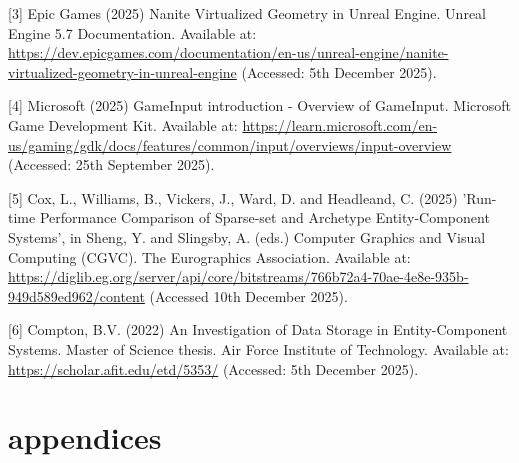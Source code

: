\documentclass[]{final_report}
\begin{document}
[3] Epic Games (2025) Nanite Virtualized Geometry in Unreal Engine. Unreal Engine 5.7 Documentation. Available at: \url{https://dev.epicgames.com/documentation/en-us/unreal-engine/nanite-virtualized-geometry-in-unreal-engine} (Accessed: 5th December 2025). \newline

[4] Microsoft (2025) GameInput introduction - Overview of GameInput. Microsoft Game Development Kit. Available at: \url{https://learn.microsoft.com/en-us/gaming/gdk/docs/features/common/input/overviews/input-overview} (Accessed: 25th September 2025). \newline

[5] Cox, L., Williams, B., Vickers, J., Ward, D. and Headleand, C. (2025) 'Run-time Performance Comparison of Sparse-set and Archetype Entity-Component Systems', in Sheng, Y. and Slingsby, A. (eds.) Computer Graphics and Visual Computing (CGVC). The Eurographics Association. Available at: \url{https://diglib.eg.org/server/api/core/bitstreams/766b72a4-70ae-4e8e-935b-949d589ed962/content} (Accessed 10th December 2025). \newline

[6] Compton, B.V. (2022) An Investigation of Data Storage in Entity-Component Systems. Master of Science thesis. Air Force Institute of Technology. Available at: \url{https://scholar.afit.edu/etd/5353/} (Accessed: 5th December 2025). \newline
\newpage
\chapter{appendices}
\end{document}
